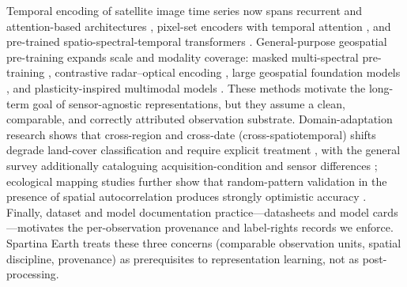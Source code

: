 Temporal encoding of satellite image time series now spans recurrent
and attention-based architectures \citep{russwurm2020selfattn},
pixel-set encoders with temporal attention
\citep{garnot2020pixelset}, and pre-trained spatio-spectral-temporal
transformers \citep{yuan2022sitsformer}. General-purpose geospatial
pre-training expands scale and modality coverage: masked
multi-spectral pre-training \citep{cong2022satmae}, contrastive
radar--optical encoding \citep{fuller2023croma}, large geospatial
foundation models \citep{jakubik2024prithvi}, and plasticity-inspired
multimodal models \citep{xiong2024dofa}. These methods motivate the
long-term goal of sensor-agnostic representations, but they assume a
clean, comparable, and correctly attributed observation substrate.
Domain-adaptation research shows that cross-region and cross-date
(cross-spatiotemporal) shifts degrade land-cover classification and
require explicit treatment \citep{tuia2016da,luo2022crossspatiotemporal},
with the general survey additionally cataloguing
acquisition-condition and sensor differences \citep{tuia2016da};
ecological mapping studies further show that random-pattern validation
in the presence of spatial autocorrelation produces strongly optimistic
accuracy \citep{roberts2017cv,ploton2020spatial}. Finally, dataset and
model documentation practice---datasheets
\citep{gebru2021datasheets} and model cards
\citep{mitchell2019modelcards}---motivates the per-observation
provenance and label-rights records we enforce. Spartina Earth treats
these three concerns (comparable observation units, spatial
discipline, provenance) as prerequisites to representation learning,
not as post-processing.
